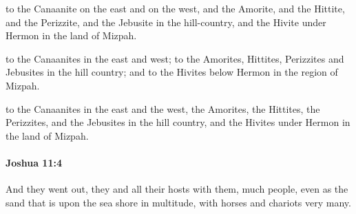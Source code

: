 			\begin{versebox}
					\item[BHS] 
					\item[ASV] to the Canaanite on the east and on the west, and the Amorite, and the Hittite, and the Perizzite, and the Jebusite in the hill-country, and the Hivite under Hermon in the land of Mizpah.
					\item[NIV] to the Canaanites in the east and west; to the Amorites, Hittites, Perizzites and Jebusites in the hill country; and to the Hivites below Hermon in the region of Mizpah.
					\item[NRSV] to the Canaanites in the east and the west, the Amorites, the Hittites, the Perizzites, and the Jebusites in the hill country, and the Hivites under Hermon in the land of Mizpah.
			\end{versebox}

		\paragraph{Joshua 11:4} %
			\label{JOSHUA-11-4}

			And they went out, they and all their hosts with them, much people, even as the sand that is upon the sea shore in multitude, with horses and chariots very many.

